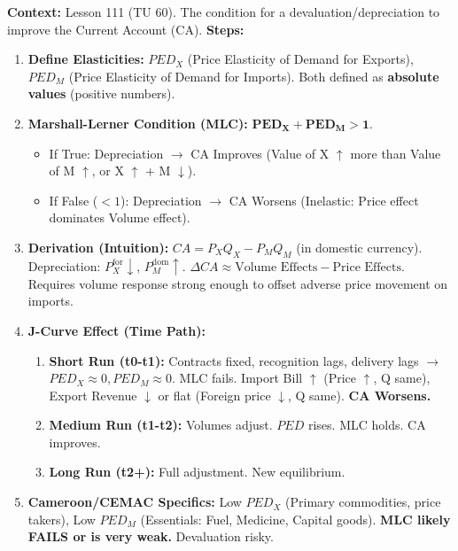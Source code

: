 \documentclass[11pt]{article}
\begin{document}
\begin{methode}
\textbf{Context:} Lesson 111 (TU 60). The condition for a devaluation/depreciation to improve the Current Account (CA).
\textbf{Steps:}
\begin{enumerate}
    \item \textbf{Define Elasticities:} $PED_X$ (Price Elasticity of Demand for Exports), $PED_M$ (Price Elasticity of Demand for Imports). Both defined as \textbf{absolute values} (positive numbers).
    \item \textbf{Marshall-Lerner Condition (MLC):} $\mathbf{PED_X + PED_M > 1}$.
        \begin{itemize}
            \item If True: Depreciation $\rightarrow$ CA Improves (Value of X $\uparrow$ more than Value of M $\uparrow$, or X $\uparrow$ + M $\downarrow$).
            \item If False ($<1$): Depreciation $\rightarrow$ CA Worsens (Inelastic: Price effect dominates Volume effect).
        \end{itemize}
    \item \textbf{Derivation (Intuition):}
        $CA = P_X Q_X - P_M Q_M$ (in domestic currency).
        Depreciation: $P_X^{\text{for}} \downarrow$, $P_M^{\text{dom}} \uparrow$.
        $\Delta CA \approx \text{Volume Effects} - \text{Price Effects}$.
        Requires volume response strong enough to offset adverse price movement on imports.
    \item \textbf{J-Curve Effect (Time Path):}
        \begin{enumerate}
            \item \textbf{Short Run (t0-t1):} Contracts fixed, recognition lags, delivery lags $\rightarrow$ $PED_X \approx 0, PED_M \approx 0$. MLC fails. Import Bill $\uparrow$ (Price $\uparrow$, Q same), Export Revenue $\downarrow$ or flat (Foreign price $\downarrow$, Q same). \textbf{CA Worsens.}
            \item \textbf{Medium Run (t1-t2):} Volumes adjust. $PED$ rises. MLC holds. CA improves.
            \item \textbf{Long Run (t2+):} Full adjustment. New equilibrium.
        \end{enumerate}
    \item \textbf{Cameroon/CEMAC Specifics:} Low $PED_X$ (Primary commodities, price takers), Low $PED_M$ (Essentials: Fuel, Medicine, Capital goods). \textbf{MLC likely FAILS or is very weak.} Devaluation risky.
\end{enumerate}
\end{methode}
\end{document}
